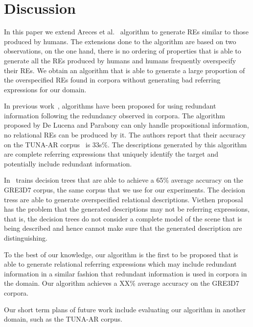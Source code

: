 \section{Discussion}
\label{sec:discussion}

In this paper we extend Areces et al.~ algorithm to generate REs similar to those produced by humans. The extensions done to the algorithm are based on two observations, on the one hand, there is no ordering of properties that is able to generate all the REs produced by humans and humans frequently overspecify their REs. We obtain an algorithm that is able to generate a large proportion of the overspecified REs found in corpora without generating bad referring expressions for our domain.

In previous work~\cite{delucena-paraboni:2008:ENLG,delucena-paraboni:2009:ENLG}, algorithms have been proposed for using redundant information following the redundancy observed in corpora. The algorithm proposed by De Lucena and Parabony can only handle propositional information, no relational REs can be produced by it. The authors report that their accuracy on the TUNA-AR corpus~\cite{gatt-balz-kow:2008:ENLG} is 33s\%. The descriptions generated by this algorithm are complete referring expressions that uniquely identify the target and potentially include redundant information. 

In~\cite{viet:gene11} trains decision trees that are able to achieve a 65\% average accuracy on the GRE3D7 corpus, the same corpus that we use for our experiments. The decision tress are able to generate overspecified relational descriptions. Viethen proposal has the problem that the generated descriptions may not be referring expressions, that is, the decision trees do not consider a complete model of the scene that is being described and hence cannot make sure that the generated description are distinguishing.  

To the best of our knowledge, our algorithm is the first to be proposed that is able to generate relational referring expressions which may include redundant information in a similar fashion that redundant information is used in corpora in the domain. Our algorithm achieves a XX\% average accuracy on the GRE3D7 corpora. 

Our short term plans of future work include evaluating our algorithm in another domain, such as the TUNA-AR corpus. 


